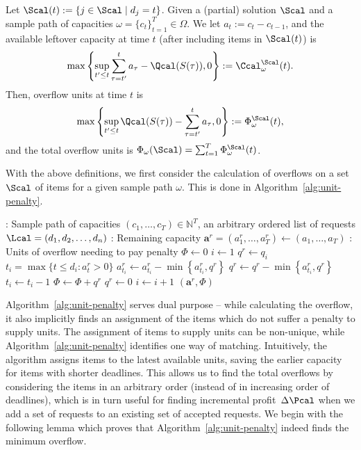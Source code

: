 Let $\Scal(t):=\{j\in\Scal\mid d_j=t\}$. Given a (partial) solution $\Scal$ and a sample path of capacities $\omega = \{c_t\}_{t=1}^T \in \Omega$. We let $a_t:= c_t-c_{t-1}$, and the available leftover capacity at time $t$ (after including items in $\Scal(t)$) is 
$$
\max\left\{\sup_{t' \le t} \sum_{\tau = t'}^t  a_\tau - \Qcal(S(\tau)), 0\right\} := \Ccal^\Scal_\omega(t).
$$ 
Then,  overflow units at time $t$ is 
$$
\max\left\{\sup_{t' \le t}\Qcal(S(\tau))- \sum_{\tau = t'}^t  a_\tau, 0\right\} := \Phi_\omega^\Scal(t),
$$
and the total overflow units is $\Phi_\omega(\Scal) = \sum_{t=1}^T\Phi_\omega^\Scal(t)$.

With the above definitions,
we first consider the calculation of overflows on a set $\Scal$ of items for a given sample path $\omega$. This is done in Algorithm~\ref{alg:unit-penalty}.

\begin{algorithm}[h]
	\footnotesize
	\caption{}
	\label{alg:unit-penalty}
	\begin{algorithmic}[1]
		\Parameters: Sample path of capacities $(c_1, \ldots, c_T) \in \mathbb{N}^T$, an arbitrary ordered list of requests $\Lcal = ( d_1, d_2, \ldots , d_n )$  
		\Initialize: Remaining capacity $\mathbf{a}^r = (a_1^r, \ldots, a_T^r) \gets (a_1, \ldots, a_T)$ 
		\Initialize: Units of overflow needing to pay penalty $\Phi \gets 0$
		\State $i \gets 1$
		\State $q^r \gets q_i$
		\State $t_i = \max \{ t \leq d_i : a_t^r > 0 \}$  
		\State $a_{t_i}^r \gets a_{t_i}^r - \min\left\{a^r_{t_i}, q^r\right\}$
		\State $q^r \gets q^r - \min\left\{a^r_{t_i}, q^r\right\}$
		\State $t_i\gets t_i-1$
		\Else 
		\State $\Phi \gets \Phi+q^r$
		\State $q^r \gets 0$
		\EndIf
		\EndWhile
		\State $i \gets i + 1$
		\EndWhile
		 $(\mathbf{a}^r, \Phi)$
	\end{algorithmic}
\end{algorithm}

Algorithm~\ref{alg:unit-penalty} serves dual purpose -- while calculating the overflow, it also implicitly finds an assignment of the items which do not suffer a penalty to supply units. The assignment of items to supply units can be non-unique, while Algorithm~\ref{alg:unit-penalty} identifies one way of matching. Intuitively, the algorithm assigns items to the latest available units, saving the earlier capacity for items with shorter deadlines. This allows us to find the total overflows by considering the items in an arbitrary order (instead of in increasing order of deadlines), which is in turn useful for finding incremental profit~$\Delta\Pcal$ when we add a set of requests to an existing set of accepted requests.
We begin with the following lemma which proves that Algorithm~\ref{alg:unit-penalty} indeed finds the minimum overflow.



